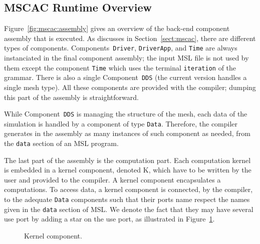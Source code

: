 \subsection{MSCAC Runtime Overview}

Figure~\ref{fig:mscac:assembly} gives an overview of the back-end component
assembly that is executed. As discusses in Section~\ref{sect:mscac},
there are different types of components. Components~\texttt{Driver},
\texttt{DriverApp}, and \texttt{Time} are always instanciated in the final component assembly; the input MSL file is not used by them except the component \texttt{Time} which uses the terminal \texttt{iteration} of the grammar. There is also a
single Component~\texttt{DDS} (the current version handles a single mesh
type). All these components are provided with the
compiler; dumping this part of the assembly is straightforward.

While Component~\texttt{DDS} is managing the structure of the mesh,
each data of the simulation is handled by a component of type
\texttt{Data}. Therefore, the compiler generates in the assembly as
many instances of such component as needed, from the \texttt{data}
section of an MSL program.

The last part of the assembly is the computation part. Each computation kernel is embedded in a kernel component, denoted K, which have to be written by the user and provided
to the compiler. A kernel component encapsulates a computations. To
access data, a kernel component is connected, by the compiler, to the adequate
\texttt{Data} components such that their ports name respect the names
given in the \texttt{data} section of MSL. We denote the fact that they may have
several use port by adding a star on the use port, as illustrated in Figure~\ref{fig:k}.
\begin{figure}
\begin{center}
\end{center}
\caption{Kernel component.}
\label{fig:k}
\end{figure}
  
